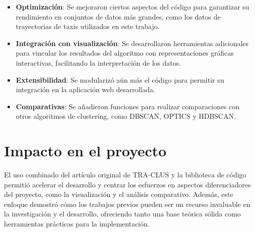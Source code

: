 \begin{itemize}
    \item \textbf{Optimización}: Se mejoraron ciertos aspectos del código para garantizar su rendimiento en conjuntos de datos más grandes, como los datos de trayectorias de taxis utilizados en este trabajo.
    \item \textbf{Integración con visualización}: Se desarrollaron herramientas adicionales para vincular los resultados del algoritmo con representaciones gráficas interactivas, facilitando la interpretación de los datos.
    \item \textbf{Extensibilidad}: Se modularizó aún más el código para permitir su integración en la aplicación web desarrollada.
    \item \textbf{Comparativas}: Se añadieron funciones para realizar comparaciones con otros algoritmos de clustering, como DBSCAN, OPTICS y HDBSCAN.
\end{itemize}

\section{Impacto en el proyecto}

El uso combinado del artículo original de TRA-CLUS y la biblioteca de código permitió acelerar el desarrollo y centrar los esfuerzos en aspectos diferenciadores del proyecto, como la visualización y el análisis comparativo. Además, este enfoque demostró cómo los trabajos previos pueden ser un recurso invaluable en la investigación y el desarrollo, ofreciendo tanto una base teórica sólida como herramientas prácticas para la implementación.
